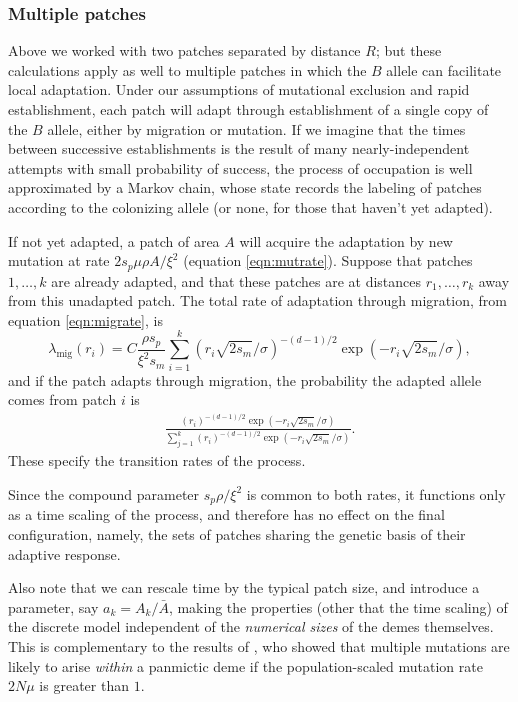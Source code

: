 \documentclass{article}
\newcommand{\migrate}{\lambda_\text{mig}}
\begin{document}
\subsubsection{Multiple patches}
Above we worked with two patches separated by distance $R$;
but these calculations apply as well to multiple patches
in which the $B$ allele can facilitate local adaptation. 
Under our assumptions of mutational exclusion and rapid establishment, 
each patch will adapt through establishment of a single copy of the $B$ allele, 
either by migration or mutation.
If we imagine that the times between successive establishments is the result of many nearly-independent attempts
with small probability of success,
the process of occupation is well approximated by a Markov chain,
whose state records the labeling of patches according to the colonizing allele
(or none, for those that haven't yet adapted).

If not yet adapted, a patch of area $A$ will acquire the adaptation by new mutation at rate $2 s_p \mu \rho A/\xi^2$ (equation \eqref{eqn:mutrate}).
Suppose that patches $1, \ldots, k$ are already adapted,
and that these patches are at distances $r_1, \ldots, r_k$ away from this unadapted patch.
The total rate of adaptation through migration, from equation \eqref{eqn:migrate}, is
\begin{equation}
  \migrate(r_i) = C \frac{ \rho s_p }{\xi^2 s_m} \sum_{i=1}^{k} \left(r_i \sqrt{2 s_m} /\sigma \right)^{-(d-1)/2} \exp\left(- r_i \sqrt{2 s_m} /\sigma\right),
\end{equation}
and if the patch adapts through migration, the probability the adapted allele 
comes from patch $i$ is 
\begin{align}  
  \frac{\left(r_i \right)^{-(d-1)/2} \exp\left(- r_i \sqrt{2 s_m}
  /\sigma\right)} {\sum_{j=1}^{k}  \left(r_i \right)^{-(d-1)/2} \exp\left(- r_i \sqrt{2 s_m}
    /\sigma\right) } .
\end{align}
These specify the transition rates of the process.

Since the compound parameter $s_p \rho / \xi^2$ is common to both rates,
it functions only as a time scaling of the process, 
and therefore has no effect on the final configuration, namely, 
the sets of patches sharing the genetic basis of their adaptive response.

Also note that we can rescale time by the typical patch size, and introduce a parameter, say $a_k = A_k/\bar A$,
making the properties (other that the time scaling) of the discrete model independent of the \emph{numerical sizes} of the demes themselves.
This is complementary to the results of \cite{softsweepsII}, who showed that multiple mutations are likely to arise \emph{within} a panmictic deme
if the population-scaled mutation rate $2 N \mu$ is greater than $1$.
\end{document}
